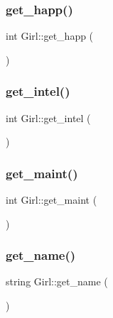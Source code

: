 \mbox{\label{classGirl_acd39699746a9220745e3d5c3f4586e38}} 
\subsubsection{\texorpdfstring{get\+\_\+happ()}{get\_happ()}}
{\footnotesize\ttfamily int Girl\+::get\+\_\+happ (\begin{DoxyParamCaption}{ }\end{DoxyParamCaption})}

\mbox{\label{classGirl_a86d5efa1b60fc9823f3e95f362f60aaa}} 
\subsubsection{\texorpdfstring{get\+\_\+intel()}{get\_intel()}}
{\footnotesize\ttfamily int Girl\+::get\+\_\+intel (\begin{DoxyParamCaption}{ }\end{DoxyParamCaption})}

\mbox{\label{classGirl_a08e38c5218b5ab4372ad44a873989774}} 
\subsubsection{\texorpdfstring{get\+\_\+maint()}{get\_maint()}}
{\footnotesize\ttfamily int Girl\+::get\+\_\+maint (\begin{DoxyParamCaption}{ }\end{DoxyParamCaption})}

\mbox{\label{classGirl_ae21337ca89029d6b5bbba9ff01694a2e}} 
\subsubsection{\texorpdfstring{get\+\_\+name()}{get\_name()}}
{\footnotesize\ttfamily string Girl\+::get\+\_\+name (\begin{DoxyParamCaption}{ }\end{DoxyParamCaption})}

